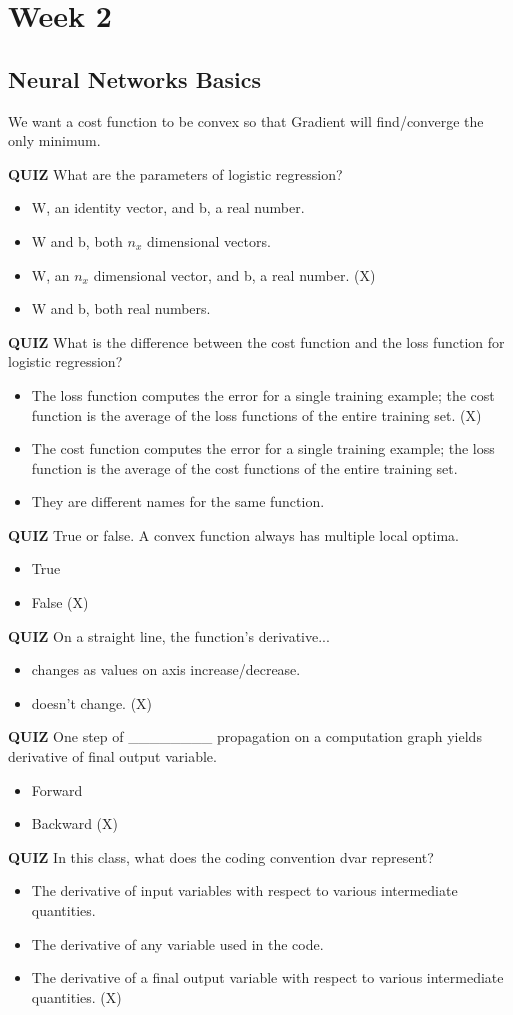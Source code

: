 \section*{Week 2}
\subsection*{Neural Networks Basics}
We want a cost function to be convex so that Gradient will find/converge the only minimum.

\textbf{QUIZ} What are the parameters of logistic regression?
\begin{itemize}
    \item W, an identity vector, and b, a real number.
    \item W and b, both $n_x$ dimensional vectors.
    \item W, an $n_x$ dimensional vector, and b, a real number. (X)
    \item W and b, both real numbers.
\end{itemize}
\textbf{QUIZ} What is the difference between the cost function and the loss function for logistic regression?
\begin{itemize}
    \item The loss function computes the error for a single training example; the cost function is the average of the loss functions of the entire training set. (X)
    \item The cost function computes the error for a single training example; the loss function is the average of the cost functions of the entire training set.
    \item They are different names for the same function.
\end{itemize}
\textbf{QUIZ} True or false. A convex function always has multiple local optima.
\begin{itemize}
    \item True
    \item False (X)
\end{itemize}
\textbf{QUIZ} On a straight line, the function's derivative...
\begin{itemize}
    \item changes as values on axis increase/decrease.
    \item doesn't change. (X)
\end{itemize}
\textbf{QUIZ} One step of \_\_\_\_\_\_\_\_ propagation on a computation graph yields derivative of final output variable.
\begin{itemize}
    \item Forward
    \item Backward (X)
\end{itemize}
\textbf{QUIZ} In this class, what does the coding convention dvar represent?
\begin{itemize}
    \item The derivative of input variables with respect to various intermediate quantities.
    \item The derivative of any variable used in the code.
    \item The derivative of a final output variable with respect to various intermediate quantities. (X)
\end{itemize}

